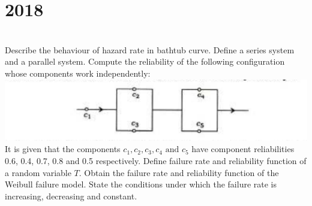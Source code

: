 \section*{2018}
\vspace{-.5cm}
\hrulefill \smallskip\\
 Describe the behaviour of hazard rate in bathtub curve.
\myline
{} Define a  series system and a parallel system. Compute the reliability of the following configuration whose components work independently: \includegraphics[]{IS/RLT/Circ1.PNG} 
It is given that the components $c_1,c_2,c_3,c_4 \text{ and } c_5$ have component reliabilities 0.6, 0.4, 0.7, 0.8 and 0.5 respectively.
\myline
{} Define failure rate and reliability function of a random variable $T$. Obtain the failure rate and reliability function of the Weibull failure model. State the conditions under which the failure rate is increasing, decreasing and constant.
